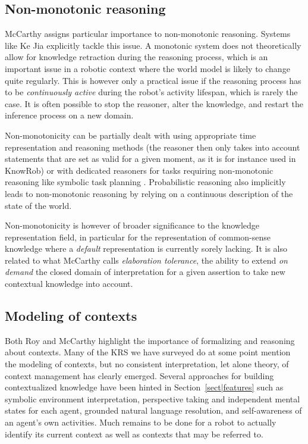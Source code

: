 \documentclass[journal]{IEEEtran}
\begin{document}
\subsection{Non-monotonic reasoning}

McCarthy assigns particular importance to non-monotonic reasoning. Systems 
like Ke Jia explicitly tackle this issue. A monotonic system does not 
theoretically allow for knowledge retraction during the reasoning process, 
which is an important issue in a robotic context where the world model is 
likely to change quite regularly. This is however only a practical issue
if the reasoning process has to be \emph{continuously active} during the 
robot's activity lifespan, which is rarely the case. It is often possible to
stop the reasoner, alter the knowledge, and restart the inference process on
a new domain.

Non-monotonicity can be partially dealt with using appropriate time
representation and reasoning methods (the reasoner then only takes into account
statements that are set as valid for a given moment, as it is for instance used 
in {\sc KnowRob}) or with dedicated reasoners for tasks requiring non-monotonic 
reasoning like symbolic task planning .
Probabilistic reasoning also implicitly leads to non-monotonic
reasoning by relying on a continuous description of the state of the
world.

Non-monotonicity is however of broader significance to the knowledge
representation field, in particular for the representation of common-sense
knowledge where a \emph{default} representation is currently sorely lacking.
It is also related to what McCarthy calls \emph{elaboration tolerance}, the
ability to extend \emph{on demand} the closed domain of interpretation for a
given assertion to take new contextual knowledge into account.


\subsection{Modeling of contexts}

Both Roy and McCarthy highlight the importance of formalizing and reasoning 
about contexts. Many of the KRS we have surveyed do at some point mention the 
modeling of contexts, but no consistent interpretation, let alone theory, of 
context management has clearly emerged. Several approaches for building 
contextualized knowledge have been hinted in Section~\ref{sect|features} such 
as symbolic environment interpretation, perspective taking and independent 
mental states for each agent, grounded natural language resolution, and 
self-awareness of an agent's own activities. Much remains to be done for a 
robot to actually identify its current context as well as contexts that
may be referred to.
\end{document}
